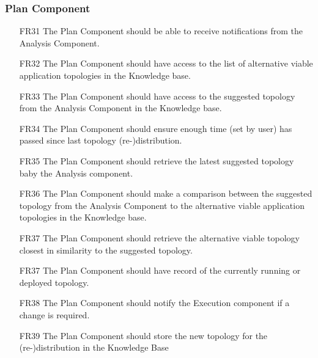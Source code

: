 \subsubsection{\textbf{Plan Component}}
\begin{itemize}
    \item [FR31] The Plan Component should be able to receive notifications from the Analysis Component.
    \item [FR32] The Plan Component should have access to the list of alternative viable application topologies in the Knowledge base.
    \item [FR33] The Plan Component should have access to the suggested topology from the Analysis Component in the Knowledge base.
    \item [FR34] The Plan Component should ensure enough time (set by user) has passed since last topology (re-)distribution.
    \item [FR35] The Plan Component should retrieve the latest suggested topology baby the Analysis component.
    \item [FR36] The Plan Component should make a comparison between the suggested topology from the Analysis Component to the alternative viable application topologies in the Knowledge base.
    \item [FR37] The Plan Component should retrieve the alternative viable topology closest in similarity to the suggested topology.
    \item [FR37] The Plan Component should have record of the currently running or deployed topology.
    \item [FR38] The Plan Component should notify the Execution component if a change is required.
    \item [FR39] The Plan Component should store the new topology for the (re-)distribution in the Knowledge Base
\end{itemize}

